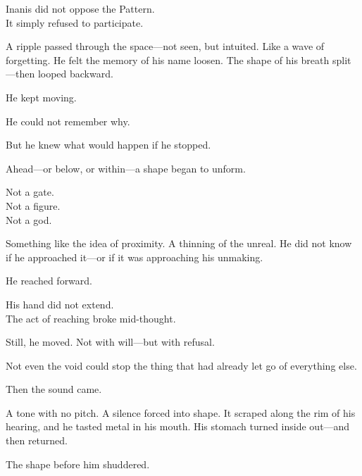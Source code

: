 \documentclass[9pt]{article}
\begin{document}
\vspace{0.5em}
Inanis did not oppose the Pattern.\\
It simply refused to participate.

\vspace{0.5em}
A ripple passed through the space---not seen, but intuited. Like a wave of forgetting. He felt the memory of his name loosen. The shape of his breath split---then looped backward.

\vspace{0.5em}
He kept moving.

\vspace{0.5em}
He could not remember why.

\vspace{0.5em}
But he knew what would happen if he stopped.

\vspace{0.5em}
Ahead---or below, or within---a shape began to unform.

\vspace{0.5em}
Not a gate.\\
Not a figure.\\
Not a god.

\vspace{0.5em}
Something like the idea of proximity. A thinning of the unreal. He did not know if he approached it---or if it was approaching his unmaking.

\vspace{0.5em}
He reached forward.

\vspace{0.5em}
His hand did not extend.\\
The act of reaching broke mid-thought.

\vspace{0.5em}
Still, he moved. Not with will---but with refusal.

\vspace{0.5em}
Not even the void could stop the thing that had already let go of everything else.

\vspace{0.5em}
Then the sound came.

\vspace{0.5em}
A tone with no pitch. A silence forced into shape. It scraped along the rim of his hearing, and he tasted metal in his mouth. His stomach turned inside out---and then returned.

\vspace{0.5em}
The shape before him shuddered.
\end{document}
